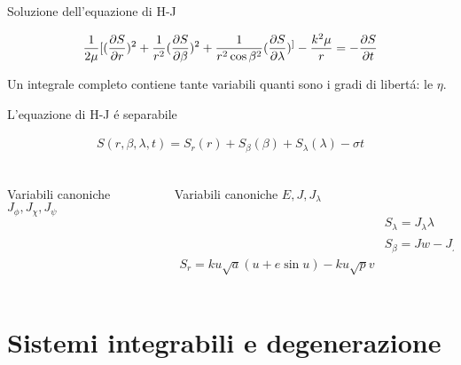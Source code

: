 \begin{frame}{Soluzione dell'equazione di H-J}

\begin{align*}
\frac{1}{2\mu}[(\PDy{r}{S})^2+\frac{1}{r^2}(\PDy{\beta}{S})^2+\frac{1}{r^2\cos{\beta}^2}(\PDy{\lambda}{S})^]-\frac{k^2\mu}{r}=-\PDy{t}{S}
\end{align*}

Un integrale completo contiene tante variabili quanti sono i gradi di libert\'a: le $\eta$.

\begin{block}{L'equazione di H-J \'e separabile}

\begin{align*}
S(r,\beta,\lambda,t)=S_r(r)+S_{\beta}(\beta)+S_{\lambda}(\lambda)-\sigma t\\
\end{align*}

\begin{columns}

\begin{column}{0.5\textwidth}

Variabili canoniche $J_{\phi}, J_{\chi}, J_{\psi}$

\end{column}

\begin{column}{0.5\textwidth}

Variabili canoniche $E, J, J_{\lambda}$

\begin{align*}
&S_{\lambda}=J_{\lambda}\lambda\\
&S_{\beta}=Jw-J_{\lambda}\bar{\lambda}\\
S_r=ku\sqrt{a}(u+e\sin{u})-ku\sqrt{p}v
\end{align*}

\end{column}

\end{columns}



\end{block}


\end{frame}



\section{Sistemi integrabili e degenerazione}


